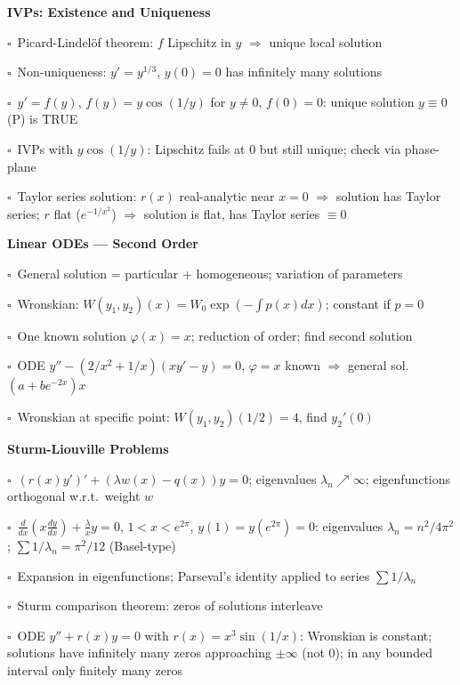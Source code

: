 \documentclass[11pt,a4paper]{article}
\newcommand{\chk}{\textcolor{rulegray}{$\square$}\ }
\begin{document}
\begin{subtopics}

  \item \textbf{IVPs: Existence and Uniqueness}
  \begin{subtopics}
    \item \chk Picard-Lindelöf theorem: $f$ Lipschitz in $y$ $\Rightarrow$ unique local solution
    \item \chk Non-uniqueness: $y'=y^{1/3}$, $y(0)=0$ has infinitely many solutions
    \item \chk $y'=f(y)$, $f(y)=y\cos(1/y)$ for $y\ne 0$, $f(0)=0$: unique solution $y\equiv 0$ (P) is TRUE
    \item \chk IVPs with $y\cos(1/y)$: Lipschitz fails at 0 but still unique; check via phase-plane
    \item \chk Taylor series solution: $r(x)$ real-analytic near $x=0$ $\Rightarrow$ solution has Taylor series; $r$ flat ($e^{-1/x^2}$) $\Rightarrow$ solution is flat, has Taylor series $\equiv 0$
  \end{subtopics}

  \item \textbf{Linear ODEs — Second Order}
  \begin{subtopics}
    \item \chk General solution = particular + homogeneous; variation of parameters
    \item \chk Wronskian: $W(y_1,y_2)(x)=W_0\exp(-\int p(x)dx)$; constant if $p=0$
    \item \chk One known solution $\varphi(x)=x$; reduction of order; find second solution
    \item \chk ODE $y''-(2/x^2+1/x)(xy'-y)=0$, $\varphi=x$ known $\Rightarrow$ general sol.\ $(a+be^{-2x})x$
    \item \chk Wronskian at specific point: $W(y_1,y_2)(1/2)=4$, find $y_2'(0)$
  \end{subtopics}

  \item \textbf{Sturm-Liouville Problems}
  \begin{subtopics}
    \item \chk $(r(x)y')' + (\lambda w(x) - q(x))y=0$; eigenvalues $\lambda_n\nearrow\infty$; eigenfunctions orthogonal w.r.t.\ weight $w$
    \item \chk $\frac{d}{dx}(x\frac{dy}{dx})+\frac{\lambda}{x}y=0$, $1<x<e^{2\pi}$, $y(1)=y(e^{2\pi})=0$: eigenvalues $\lambda_n=n^2/4\pi^2$; $\sum 1/\lambda_n=\pi^2/12$ (Basel-type)
    \item \chk Expansion in eigenfunctions; Parseval's identity applied to series $\sum 1/\lambda_n$
    \item \chk Sturm comparison theorem: zeros of solutions interleave
    \item \chk ODE $y''+r(x)y=0$ with $r(x)=x^3\sin(1/x)$: Wronskian is constant; solutions have infinitely many zeros approaching $\pm\infty$ (not 0); in any bounded interval only finitely many zeros
  \end{subtopics}


\end{subtopics}
\end{document}
